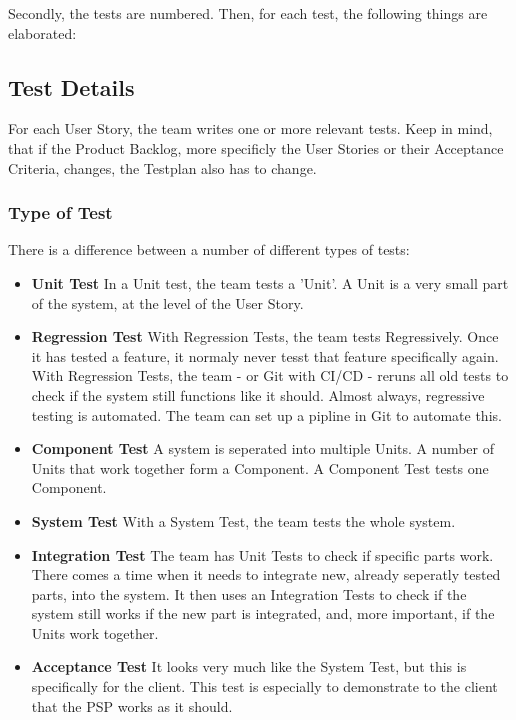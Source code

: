 \documentclass[10pt]{report}
\begin{document}
Secondly, the tests are numbered. Then, for each test, the following things are elaborated:

\subsection{Test Details}

For each User Story, the team writes one or more relevant tests. Keep in mind, that if the Product Backlog, more specificly the User Stories or their Acceptance Criteria, changes, the Testplan also has to change. 

\subsubsection{Type of Test}
There is a difference between a number of different types of tests:

\begin{itemize}
	\item \textbf{Unit Test} In a Unit test, the team tests a 'Unit'. A Unit is a very small part of the system, at the level of the User Story.
	\item \textbf{Regression Test} With Regression Tests, the team tests Regressively. Once it has tested a feature, it normaly never tesst that feature specifically again. With Regression Tests, the team - or Git with CI/CD - reruns all old tests to check if the system still functions like it should. Almost always, regressive testing is automated. The team can set up a pipline in Git to automate this.
	\item \textbf{Component Test} A system is seperated into multiple Units. A number of Units that work together form a Component. A Component Test tests one Component.
	\item \textbf{System Test} With a System Test, the team tests the whole system.
	\item \textbf{Integration Test} The team has Unit Tests to check if specific parts work. There comes a time when it needs to integrate new, already seperatly tested parts, into the system. It then uses an Integration Tests to check if the system still works if the new part is integrated, and, more important, if the Units work together.
	\item \textbf{Acceptance Test} It looks very much like the System Test, but this is specifically for the client. This test is especially to demonstrate to the client that the PSP works as it should.
\end{itemize}
\end{document}

